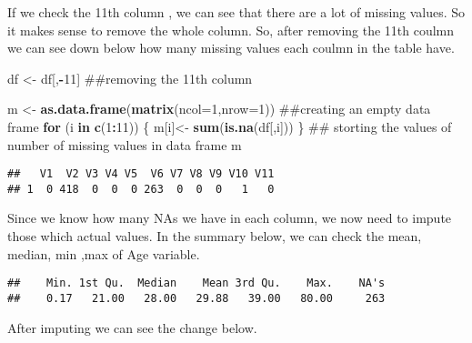 \documentclass[]{article}
\newenvironment{Shaded}{\begin{snugshade}}{\end{snugshade}}
\newcommand{\KeywordTok}[1]{\textcolor[rgb]{0.13,0.29,0.53}{\textbf{#1}}}
\newcommand{\DataTypeTok}[1]{\textcolor[rgb]{0.13,0.29,0.53}{#1}}
\newcommand{\DecValTok}[1]{\textcolor[rgb]{0.00,0.00,0.81}{#1}}
\newcommand{\StringTok}[1]{\textcolor[rgb]{0.31,0.60,0.02}{#1}}
\newcommand{\OtherTok}[1]{\textcolor[rgb]{0.56,0.35,0.01}{#1}}
\newcommand{\ControlFlowTok}[1]{\textcolor[rgb]{0.13,0.29,0.53}{\textbf{#1}}}
\newcommand{\OperatorTok}[1]{\textcolor[rgb]{0.81,0.36,0.00}{\textbf{#1}}}
\newcommand{\NormalTok}[1]{#1}
\begin{document}
If we check the 11th column , we can see that there are a lot of missing
values. So it makes sense to remove the whole column. So, after removing
the 11th coulmn we can see down below how many missing values each
coulmn in the table have.

\begin{Shaded}
\begin{Highlighting}[]
\NormalTok{df <-}\StringTok{ }\NormalTok{df[,}\OperatorTok{-}\DecValTok{11}\NormalTok{] ##removing the 11th column}

\NormalTok{m <-}\StringTok{ }\KeywordTok{as.data.frame}\NormalTok{(}\KeywordTok{matrix}\NormalTok{(}\DataTypeTok{ncol=}\DecValTok{1}\NormalTok{,}\DataTypeTok{nrow=}\DecValTok{1}\NormalTok{))   ##creating an empty data frame}
\ControlFlowTok{for}\NormalTok{ (i }\ControlFlowTok{in} \KeywordTok{c}\NormalTok{(}\DecValTok{1}\OperatorTok{:}\DecValTok{11}\NormalTok{)) \{ m[i]<-}\StringTok{ }\KeywordTok{sum}\NormalTok{(}\KeywordTok{is.na}\NormalTok{(df[,i])) \}   ## storting the values of number of missing values in data frame}
\NormalTok{m}
\end{Highlighting}
\end{Shaded}

\begin{verbatim}
##   V1  V2 V3 V4 V5  V6 V7 V8 V9 V10 V11
## 1  0 418  0  0  0 263  0  0  0   1   0
\end{verbatim}

Since we know how many NAs we have in each column, we now need to impute
those which actual values. In the summary below, we can check the mean,
median, min ,max of Age variable.

\begin{Shaded}
\end{Shaded}

\begin{verbatim}
##    Min. 1st Qu.  Median    Mean 3rd Qu.    Max.    NA's 
##    0.17   21.00   28.00   29.88   39.00   80.00     263
\end{verbatim}

After imputing we can see the change below.

\begin{Shaded}
\end{Shaded}
\end{document}
